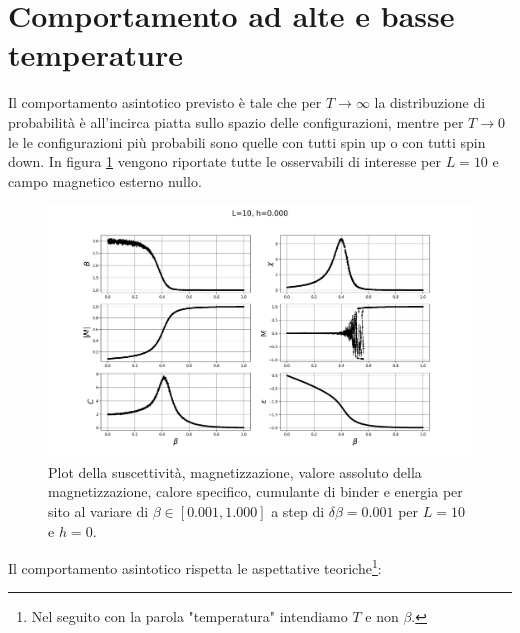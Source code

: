 \documentclass[10pt,a4paper]{article}
\begin{document}



\section{Comportamento ad alte e basse temperature}\label{CompAsint}
Il comportamento asintotico previsto è tale che per $T\rightarrow\infty$ la distribuzione di probabilità è all'incirca piatta sullo spazio delle configurazioni, mentre per $T\rightarrow 0$ le le configurazioni più probabili sono quelle con tutti spin up o con tutti spin down.
In figura \ref{beta01} vengono riportate tutte le osservabili di interesse per $L=10$ e campo magnetico esterno nullo.
\begin{figure}[h!]
	\centering
	\includegraphics[width=1\linewidth]{beta01}
	\caption{Plot della suscettività, magnetizzazione, valore assoluto della magnetizzazione, calore specifico, cumulante di binder e energia per sito al variare di $\beta\in[0.001,1.000]$ a step di $\delta\beta=0.001$ per $L=10$ e $h=0$.}
	\label{beta01}
\end{figure}
Il comportamento asintotico rispetta le aspettative teoriche\footnote{Nel seguito con la parola "temperatura" intendiamo $T$ e non $\beta$.}:
\end{document}
